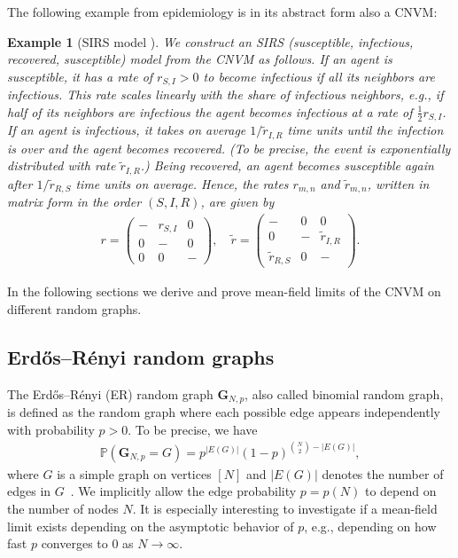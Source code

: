 \documentclass[a4paper,
               10pt,
               pdftex,
               normalheadings,
               headsepline,
               footsepline,
               headinclude,
               footinclude,
               DIV=14,
               abstracton]
{scrartcl}
\newtheorem{example}[theorem]{Example}
\newcommand{\rv}[1]{\bm{#1}}
\newcommand{\review}[1]{{#1}}
\begin{document}
The following example from epidemiology is in its abstract form also a CNVM:
\begin{example}[SIRS model \cite{Volz2007}] \label{example:SIR}
We construct an SIRS (susceptible, infectious, recovered, susceptible) model from the CNVM as follows. If an agent is susceptible, it has a rate of $r_{S,I} > 0$ to become infectious if all its neighbors are infectious. This rate scales linearly with the share of infectious neighbors, e.g., if half of its neighbors are infectious the agent becomes infectious at a rate of $\frac{1}{2} r_{S,I}$.
If an agent is infectious, it takes on average $ 1 / \tilde{r}_{I,R}$ time units until the infection is over and the agent becomes recovered. (To be precise, the event is exponentially distributed with rate $\tilde{r}_{I,R}$.)
Being recovered, an agent becomes susceptible again after $1 / \tilde{r}_{R,S}$ time units on average.
Hence, the rates $r_{m,n}$ and $\tilde{r}_{m,n}$, written in matrix form in the order $(S,I,R)$, are given by
\begin{align}
r = \begin{pmatrix}
- & r_{S,I} & 0\\
0 & - & 0\\
0 & 0 & -
\end{pmatrix}, \quad \tilde{r} = \begin{pmatrix}
- & 0 & 0\\
0 & - & \tilde{r}_{I,R}\\
\tilde{r}_{R,S} & 0 & -
\end{pmatrix}.
\end{align}
\end{example}

In the following sections we derive and prove mean-field limits of the CNVM on different random graphs.

\subsection{Erd\H{o}s--Rényi random graphs} \label{subsec:ER}

The Erd\H{o}s--Rényi (ER) random graph $\rv{G}_{N,p}$, also called binomial random graph, is defined as the random graph where each possible edge appears independently with probability $p>0$. To be precise, we have
\begin{align}
    \mathbb{P}(\rv{G}_{N, p} = G) = p^{\lvert E(G) \rvert} (1 - p)^{\binom{N}{2} - \lvert E(G) \rvert},
\end{align}
where $G$ is a simple graph on vertices $[N]$ and $|E(G)|$ denotes the number of edges in $G$~\cite{Frieze2015}.
\review{We implicitly allow the edge probability $p = p(N)$ to depend on the number of nodes $N$.
It is especially interesting to investigate if a mean-field limit exists depending on the asymptotic behavior of $p$, e.g., depending on how fast $p$ converges to $0$ as $N \to \infty$.}
\end{document}
